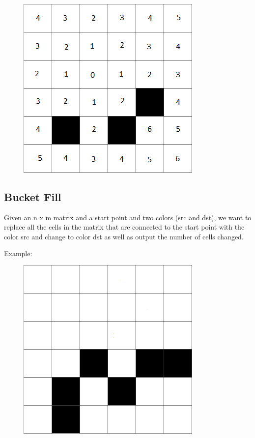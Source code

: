 \documentclass[11pt,oneside]{book}
\makeatletter
\def\maxwidth#1{\ifdim\Gin@nat@width>#1 #1\else\Gin@nat@width\fi}
\makeatother
\begin{document}
\vspace{5px}\begin{figure}[H]\centering
        \includegraphics[width=0.66\maxwidth{\textwidth}]{floodfill.png}
        \end{figure}

\subsection{Bucket Fill}

Given an n x m matrix and a start point and two colors (src and dst), we want to replace all the cells in the matrix that are connected to the start point with the color src and change to color dst as well as output the number of cells changed.

Example:

\vspace{5px}\begin{figure}[H]\centering
        \includegraphics[width=0.66\maxwidth{\textwidth}]{bucket.png}
        \end{figure}
\end{document}
